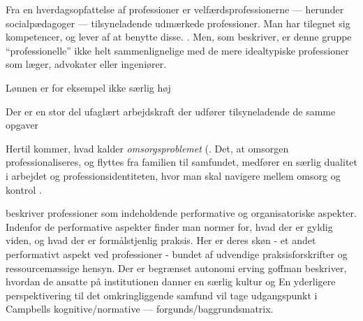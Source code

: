 Fra en hverdagsopfattelse af professioner er velfærdsprofessionerne — herunder socialpædagoger — tilsyneladende udmærkede professioner. Man har tilegnet sig kompetencer, og lever af at benytte disse. \autocite[ss. 443-444]{frederiksenVelfaerdsprofessionerMellemOmsorg2017}.
Men, som \citeauthor{frederiksenVelfaerdsprofessionerMellemOmsorg2017} beskriver, er denne gruppe “professionelle” ikke helt sammenlignelige med de mere idealtypiske professioner som læger, advokater eller ingeniører.

Lønnen er for eksempel ikke særlig høj

Der er en stor del ufaglært arbejdskraft der udfører tilsyneladende de samme opgaver 


Hertil kommer, hvad \citeauthor{frederiksenVelfaerdsprofessionerMellemOmsorg2017} kalder \textit{omsorgsproblemet} (.
Det, at omsorgen professionaliseres, og flyttes fra familien til samfundet, medfører en særlig dualitet i arbejdet og professionsidentiteten, hvor man skal navigere mellem omsorg og kontrol \autocite[s. 461]{frederiksenVelfaerdsprofessionerMellemOmsorg2017}.

\citeauthor{molanderProfesjonsstudierIntroduksjon2008} beskriver professioner som indeholdende performative og organisatoriske aspekter.
Indenfor de performative aspekter finder man normer for, hvad der er gyldig viden, og hvad der er formålstjenlig praksis.
Her er deres skøn - et andet performativt aspekt ved professioner - bundet af udvendige praksisforskrifter og ressourcemæssige hensyn.
Der er begrænset autonomi
erving goffman beskriver, hvordan de ansatte på institutionen danner en særlig kultur og 
En yderligere perspektivering til det omkringliggende samfund 
vil tage udgangspunkt i Campbells kognitive/normative — forgunds/baggrundsmatrix.

